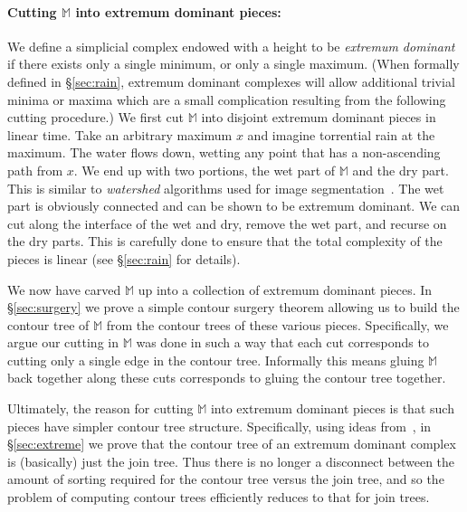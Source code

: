\documentclass[11pt]{article}
\newcommand{\myparagraph}[1]{\paragraph{#1}}
\theoremstyle{definition}
\newcommand{\MM}{\mathbb{M}}
\newcommand{\Sec}[1]{\hyperref[sec:#1]{\S\ref*{sec:#1}}} %
\begin{document}
 
\myparagraph{Cutting $\MM$ into extremum dominant pieces:} We define a simplicial complex
endowed with a height to be \emph{extremum dominant} if there exists only a single minimum, or only a single maximum.
(When formally defined in \Sec{rain}, extremum dominant complexes will allow additional trivial minima or maxima which are a small complication resulting from the following cutting procedure.)
We first cut $\MM$ into disjoint extremum dominant pieces in linear time.
Take an arbitrary maximum $x$ and imagine torrential rain at the maximum. The water flows down, wetting any point that has a non-ascending path 
from $x$. We end up with two portions, the wet part of $\MM$ and the dry part. This is similar
to \emph{watershed} algorithms used for image segmentation~\cite{RoMe00}. The wet part is obviously connected and
can be shown to be extremum dominant. We can cut along the interface of the wet and dry, remove
the wet part, and recurse on the dry parts. This is carefully done to ensure that the total complexity
of the pieces is linear (see \Sec{rain} for details).
% 
% 

We now have carved $\MM$ up into a collection of extremum dominant pieces. 
In \Sec{surgery} we prove a simple contour surgery theorem allowing us to build the contour tree of $\MM$
from the contour trees of these various pieces.  Specifically, we argue our cutting in $\MM$ was done in such a way that 
each cut corresponds to cutting only a single edge in the contour tree.  Informally this means gluing $\MM$ back together along these 
cuts corresponds to gluing the contour tree together.

Ultimately, the reason for cutting $\MM$ into extremum dominant pieces is that such pieces have simpler contour tree structure. 
Specifically, using ideas from~\cite{csa-cctad-03}, in \Sec{extreme} we prove that the contour tree of an extremum dominant complex is (basically) just the join tree. 
Thus there is no longer a disconnect between the amount of sorting required for the contour tree versus the join tree, 
and so the problem of computing contour trees efficiently reduces to that for join trees.
\end{document}
